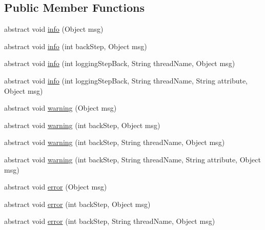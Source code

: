 \subsection*{Public Member Functions}
\begin{DoxyCompactItemize}
\item 
abstract void \hyperlink{classit_1_1emarolab_1_1cagg_1_1debugging_1_1DebuggingText_1_1LoggerBase_af439f4eba0a0b5874e563af57e8d4099}{info} (Object msg)
\item 
abstract void \hyperlink{classit_1_1emarolab_1_1cagg_1_1debugging_1_1DebuggingText_1_1LoggerBase_aa33ca58b5a4f98e815fe3718eb26b6e4}{info} (int back\-Step, Object msg)
\item 
abstract void \hyperlink{classit_1_1emarolab_1_1cagg_1_1debugging_1_1DebuggingText_1_1LoggerBase_a7e4b7f27670c4ac74303e087707bbd4a}{info} (int logging\-Step\-Back, String thread\-Name, Object msg)
\item 
abstract void \hyperlink{classit_1_1emarolab_1_1cagg_1_1debugging_1_1DebuggingText_1_1LoggerBase_a7db6fe4d14f72c8f96276391d41e7edd}{info} (int logging\-Step\-Back, String thread\-Name, String attribute, Object msg)
\item 
abstract void \hyperlink{classit_1_1emarolab_1_1cagg_1_1debugging_1_1DebuggingText_1_1LoggerBase_a4170ac5d9ecef073404fc3b08e34a32b}{warning} (Object msg)
\item 
abstract void \hyperlink{classit_1_1emarolab_1_1cagg_1_1debugging_1_1DebuggingText_1_1LoggerBase_ab16cc68b2b5a3bb6afdf383f03715206}{warning} (int back\-Step, Object msg)
\item 
abstract void \hyperlink{classit_1_1emarolab_1_1cagg_1_1debugging_1_1DebuggingText_1_1LoggerBase_abb8e8cb5ef64a9d3e8cbcad96a21194a}{warning} (int back\-Step, String thread\-Name, Object msg)
\item 
abstract void \hyperlink{classit_1_1emarolab_1_1cagg_1_1debugging_1_1DebuggingText_1_1LoggerBase_a124608e6e02de276f1f3cf52c431dc40}{warning} (int back\-Step, String thread\-Name, String attribute, Object msg)
\item 
abstract void \hyperlink{classit_1_1emarolab_1_1cagg_1_1debugging_1_1DebuggingText_1_1LoggerBase_af66f5989d0e32c463a1f90a0a9aa2d2b}{error} (Object msg)
\item 
abstract void \hyperlink{classit_1_1emarolab_1_1cagg_1_1debugging_1_1DebuggingText_1_1LoggerBase_a8e1802cffc775ea4a29836dae96c0e93}{error} (int back\-Step, Object msg)
\item 
abstract void \hyperlink{classit_1_1emarolab_1_1cagg_1_1debugging_1_1DebuggingText_1_1LoggerBase_a3746fbac1a6841f211920e3d074e0757}{error} (int back\-Step, String thread\-Name, Object msg)

\end{DoxyCompactItemize}
